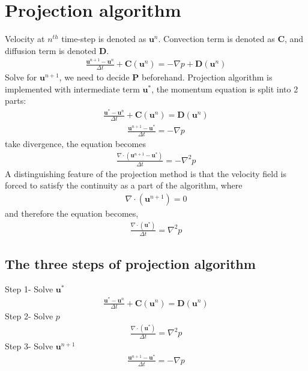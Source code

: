 \documentclass[11pt,dvips]{article}
\numberwithin{equation}{section}
\begin{document}
\section{Projection algorithm}
Velocity at $n^{th}$ time-step is denoted as $\mathbf{u}^n$. Convection term is denoted as $\mathbf{C}$, and diffusion term is denoted $\mathbf{D}$.
\begin{align*}
\frac{\mathbf{u}^{n+1}-\mathbf{u}^{n}}{\Delta t}+\mathbf{C}(\mathbf{u}^{n})=-\nabla p+\mathbf{D}(\mathbf{u}^{{n}}) 
\label{6}
\end{align*}
Solve for $\mathbf{u}^{n+1}$, we need to decide $\mathbf{P}$ beforehand. Projection algorithm is implemented with intermediate term $\mathbf{u}^{*}$, the momentum equation is split into 2 parts: 
\begin{align*}
\frac{\mathbf{u}^{*}-\mathbf{u}^{n}}{\Delta t}+\mathbf{C}(\mathbf{u}^{n})=\mathbf{D}(\mathbf{u}^{{n}}) 
\label{6a} 
\end{align*}
\begin{align*}
\frac{\mathbf{u}^{n+1}-\mathbf{u}^{*}}{\Delta t}=-\nabla p
\label{6b}
\end{align*}
take divergence, the equation becomes
\begin{align*}
\frac{\nabla \cdot(\mathbf{u}^{n+1}-\mathbf{u}^{*})}{\Delta t}=-\nabla ^2 p
\label{7}
\end{align*}
A distinguishing feature of the projection method is that the velocity field is forced to satisfy the continuity as a part of the algorithm, where
\begin{align*}
\nabla \cdot(\mathbf{u}^{n+1})=0
\label{8}
\end{align*}
and therefore  the equation becomes, 
\begin{align*}
\frac{\nabla \cdot(\mathbf{u}^{*})}{\Delta t}=\nabla ^2 p
\label{9}
\end{align*}

\subsection{The three steps of projection algorithm}
Step 1- Solve $\mathbf{u}^{*}$
\begin{align*}
\frac{\mathbf{u}^{*}-\mathbf{u}^{n}}{\Delta t}+\mathbf{C}(\mathbf{u}^{n})=\mathbf{D}(\mathbf{u}^{{n}}) 
\label{6a}
\end{align*}
Step 2- Solve $p$
\begin{align*}
\frac{\nabla \cdot(\mathbf{u}^{*})}{\Delta t}=\nabla ^2 p
\label{9}
\end{align*}
Step 3- Solve $\mathbf{u}^{n+1}$
\begin{align*}
\frac{\mathbf{u}^{n+1}-\mathbf{u}^{*}}{\Delta t}=-\nabla p
\label{6b}
\end{align*}
\end{document}
